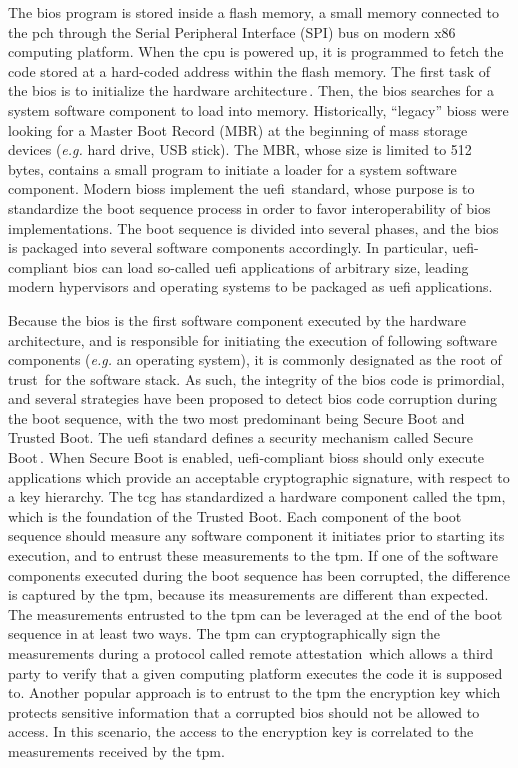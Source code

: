 The \ac{bios} program is stored inside a flash memory, a small memory connected
to the \ac{pch} through the Serial Peripheral Interface (SPI) bus on modern x86
computing platform.
%
When the \ac{cpu} is powered up, it is programmed to fetch the code stored at a
hard-coded address within the flash memory.
%
The first task of the \ac{bios} is to initialize the hardware
architecture\,\cite{salihun2006bios}.
%
Then, the \ac{bios} searches for a system software component to load into
memory.
%
Historically, ``legacy'' \acp{bios} were looking for a Master Boot Record (MBR)
at the beginning of mass storage devices (\emph{e.g.} hard drive, USB stick).
%
The MBR, whose size is limited to 512 bytes, contains a small program to
initiate a loader for a system software component.
%
Modern \acp{bios} implement the \ac{uefi}\,\cite{zimmer2007uefi,uefi2017specs}
standard, whose purpose is to standardize the boot sequence process in order to
favor interoperability of \ac{bios} implementations.
%
The boot sequence is divided into several phases, and the \ac{bios} is packaged
into several software components accordingly.
%
In particular, \ac{uefi}-compliant \ac{bios} can load so-called \ac{uefi}
applications of arbitrary size, leading modern hypervisors and operating systems
to be packaged as \ac{uefi} applications.

Because the \ac{bios} is the first software component executed by the hardware
architecture, and is responsible for initiating the execution of following
software components (\emph{e.g.} an operating system), it is commonly designated
as the root of trust\,\cite{rutkowska2015intel} for the software stack.
%
As such, the integrity of the \ac{bios} code is primordial, and several
strategies have been proposed to detect \ac{bios} code corruption during the
boot sequence, with the two most predominant being Secure Boot and Trusted Boot.
%
The \ac{uefi} standard defines a security mechanism called Secure
Boot\,\cite{rosenbaum2012secboot}.
%
When Secure Boot is enabled, \ac{uefi}-compliant \acp{bios} should only execute
applications which provide an acceptable cryptographic signature, with respect
to a key hierarchy.
%
The \ac{tcg} has standardized a hardware component called the \ac{tpm}, which is
the foundation of the Trusted Boot.
%
Each component of the boot sequence should measure any software component it
initiates prior to starting its execution, and to entrust these measurements to
the \ac{tpm}.
%
If one of the software components executed during the boot sequence has been
corrupted, the difference is captured by the \ac{tpm}, because its measurements
are different than expected.
%
The measurements entrusted to the \ac{tpm} can be leveraged at the end of the
boot sequence in at least two ways.
%
The \ac{tpm} can cryptographically sign the measurements during a protocol
called remote attestation\,\cite{coker2011remoteattestation} which allows a
third party to verify that a given computing platform executes the code it is
supposed to.
%
Another popular approach is to entrust to the \ac{tpm} the encryption key which
protects sensitive information that a corrupted \ac{bios} should not be allowed
to access.
%
In this scenario, the access to the encryption key is correlated to the
measurements received by the \ac{tpm}.

